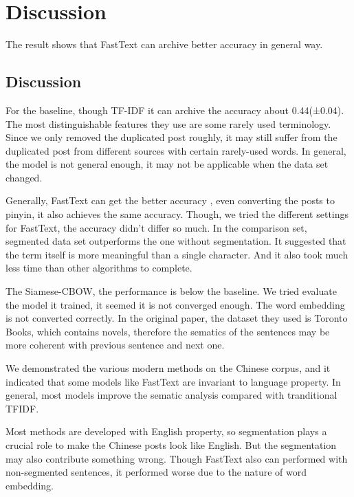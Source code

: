 \chapter{Discussion}

The result shows that FastText can archive better accuracy in general way.

\section{Discussion}


For the baseline, though TF-IDF it can archive the accuracy about 0.44(±0.04). 
The most distinguishable features they use are some rarely used terminology. 
Since we only removed the duplicated post roughly, it may still suffer from the duplicated post from different sources with certain rarely-used words. 
In general, the model is not general enough, it may not be applicable when the data set changed.

Generally, FastText can get the better accuracy , even converting the posts to pinyin,
it also achieves the same accuracy. Though, we tried the different settings for FastText,
the accuracy didn't differ so much. In the comparison set, segmented data set outperforms the one without segmentation. 
It suggested that the term itself is more meaningful than a single character. And it also took much less time than other algorithms to complete.

The Siamese-CBOW, the performance is below the baseline. 
We tried evaluate the model it trained, it seemed it is not converged enough. 
The word embedding is not converted correctly. 
In the original paper, the dataset they used is Toronto Books, which contains novels,
 therefore the sematics of the sentences may be more coherent with previous sentence and next one. 


We demonstrated the various modern methods on the Chinese corpus, and it indicated that some models like FastText are invariant to language property. In general, most models improve the sematic analysis compared with tranditional TFIDF.

Most methods are developed with English property, so segmentation plays a crucial role to make the Chinese posts look like English.
 But the segmentation may also contribute something wrong. Though FastText also can performed with non-segmented sentences, it performed worse due to  the nature of word embedding.
